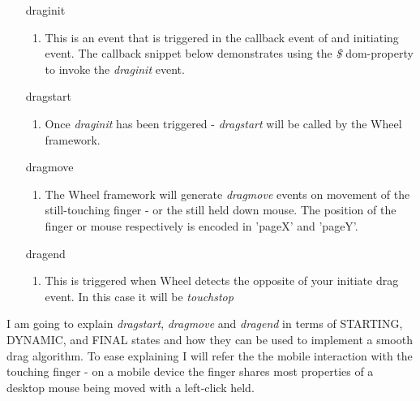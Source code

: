  \begin{itemize}
   \item[draginit]
     \begin{enumerate}
       \item This is an event that is triggered in the callback event of
                   and initiating event. The callback snippet below demonstrates 
                   using the \emph{\$} dom-property to invoke the \emph{draginit} event.
                  
     \end{enumerate}
   \item[dragstart] 
 \begin{enumerate}
   \item Once \emph{draginit} has been triggered - 
                    \emph{dragstart} will be called by the Wheel framework.
   
 \end{enumerate}
   \item[dragmove] 
     \begin{enumerate}
       \item The Wheel framework will generate \emph{dragmove} events on movement of the still-touching
                   finger - or the still held down mouse. The position of the finger
                   or mouse respectively is encoded in 'pageX' and 'pageY'.
   
     \end{enumerate}
   \item[dragend]
    \begin{enumerate}
      \item This is triggered when Wheel detects the 
                   opposite of your initiate drag event. In this case it will be 
                   \emph{touchstop}
    

    \end{enumerate}
\end{itemize}


 I am going to explain \emph{dragstart}, \emph{dragmove} and \emph{dragend} in terms of STARTING, DYNAMIC, and FINAL states
 and how they can be used to implement a smooth drag algorithm.
 To ease explaining
 I will refer the the mobile interaction with the touching finger - on a mobile device the finger shares most
 properties of a desktop mouse being moved with a left-click held. 

